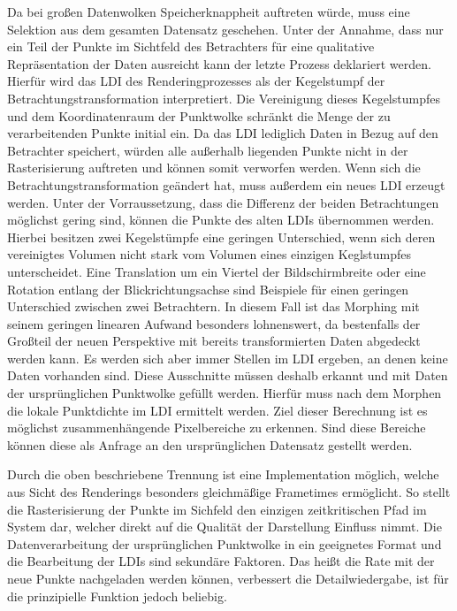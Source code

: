 \documentclass[hyperref, beleg, german]{cgvpub}
\begin{document}
Da bei großen Datenwolken Speicherknappheit auftreten würde, muss eine
Selektion aus dem gesamten Datensatz geschehen. Unter der Annahme, dass nur ein
Teil der Punkte im Sichtfeld des Betrachters für eine qualitative
Repräsentation der Daten ausreicht kann der letzte Prozess deklariert werden.
Hierfür wird das LDI des Renderingprozesses als der Kegelstumpf der
Betrachtungstransformation interpretiert. Die Vereinigung dieses Kegelstumpfes
und dem Koordinatenraum der Punktwolke schränkt die Menge der zu verarbeitenden
Punkte initial ein. Da das LDI lediglich Daten in Bezug auf den Betrachter
speichert, würden alle außerhalb liegenden Punkte nicht in der Rasterisierung
auftreten und können somit verworfen werden. Wenn sich die
Betrachtungstransformation geändert hat, muss außerdem ein neues LDI erzeugt
werden. Unter der Vorraussetzung, dass die Differenz der beiden Betrachtungen
möglichst gering sind, können die Punkte des alten LDIs übernommen werden.
Hierbei besitzen zwei Kegelstümpfe eine geringen Unterschied, wenn sich deren
vereinigtes Volumen nicht stark vom Volumen eines einzigen Keglstumpfes
unterscheidet. Eine Translation um ein Viertel der Bildschirmbreite oder eine
Rotation entlang der Blickrichtungsachse sind Beispiele für einen geringen
Unterschied zwischen zwei Betrachtern. In diesem Fall ist das Morphing mit
seinem geringen linearen Aufwand besonders lohnenswert, da bestenfalls der
Großteil der neuen Perspektive mit bereits transformierten Daten abgedeckt
werden kann. Es werden sich aber immer Stellen im LDI ergeben, an denen keine
Daten vorhanden sind. Diese Ausschnitte müssen deshalb erkannt und mit Daten
der ursprünglichen Punktwolke gefüllt werden. Hierfür muss nach dem Morphen die
lokale Punktdichte im LDI ermittelt werden. Ziel dieser Berechnung ist es
möglichst zusammenhängende Pixelbereiche zu erkennen. Sind diese Bereiche
können diese als Anfrage an den ursprünglichen Datensatz gestellt werden.

Durch die oben beschriebene Trennung ist eine Implementation möglich, welche
aus Sicht des Renderings besonders gleichmäßige Frametimes ermöglicht. So
stellt die Rasterisierung der Punkte im Sichfeld den einzigen zeitkritischen
Pfad im System dar, welcher direkt auf die Qualität der Darstellung Einfluss
nimmt. Die Datenverarbeitung der ursprünglichen Punktwolke in ein geeignetes
Format und die Bearbeitung der LDIs sind sekundäre Faktoren. Das heißt die Rate
mit der neue Punkte nachgeladen werden können, verbessert die Detailwiedergabe,
ist für die prinzipielle Funktion jedoch beliebig.
\end{document}
